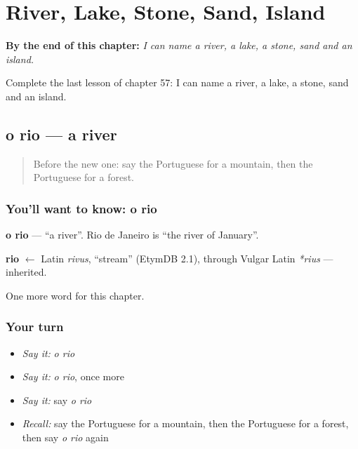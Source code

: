 
\chapter{River, Lake, Stone, Sand, Island}
\label{ch:pt-river-lake-stone-sand-island}

\begin{chapteropening}
\textbf{By the end of this chapter:} \emph{I can name a river, a lake, a stone, sand and an island.}

Complete the last lesson of chapter 57: I can name a river, a lake, a stone, sand and an island.
\end{chapteropening}

\section[o rio]{o rio — a river}

\label{lesson:PT-C57-rio}



\begin{quote}
Before the new one: say the Portuguese for a mountain, then the Portuguese for a forest.
\end{quote}

\subsection*{You'll want to know: o rio}
\textbf{o rio} — \textquotedblleft{}a river\textquotedblright{}. Rio de Janeiro is \textquotedblleft{}the river of January\textquotedblright{}.

\begin{cousinweb}
\textbf{rio} $\leftarrow$ Latin \emph{rivus}, \textquotedblleft{}stream\textquotedblright{} (EtymDB 2.1), through Vulgar Latin \emph{*rius} — inherited.
\end{cousinweb}

\begin{grammarlens}[title={What you've built}]
One more word for this chapter.
\end{grammarlens}

\subsection*{Your turn}
\begin{itemize}
\raggedright
  \item \emph{Say it:} \emph{o rio}
  \item \emph{Say it:} \emph{o rio}, once more
  \item \emph{Say it:} say \emph{o rio}
  \item \emph{Recall:} say the Portuguese for a mountain, then the Portuguese for a forest, then say \emph{o rio} again
\end{itemize}

